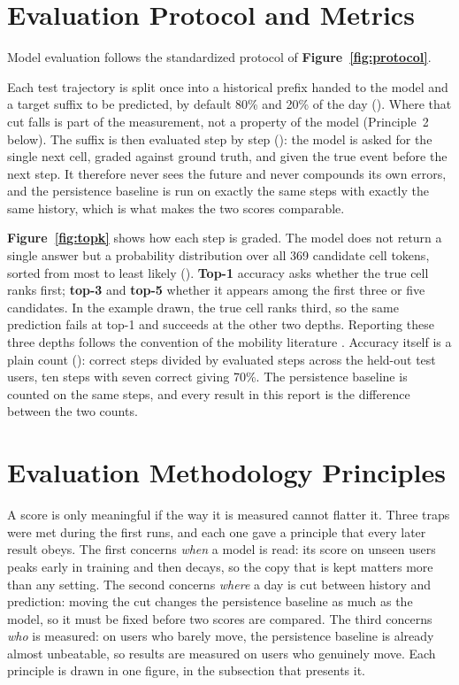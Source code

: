 \section{Evaluation Protocol and Metrics}
\label{sec:scoring}

Model evaluation follows the standardized protocol of \textbf{Figure~\ref{fig:protocol}}.



Each test trajectory is split once into a historical prefix handed to the model and a target suffix to be predicted, by default 80\% and 20\% of the day (\textbf{}). Where that cut falls is part of the measurement, not a property of the model (Principle~2 below). The suffix is then evaluated step by step (\textbf{}): the model is asked for the single next cell, graded against ground truth, and given the true event before the next step. It therefore never sees the future and never compounds its own errors, and the persistence baseline is run on exactly the same steps with exactly the same history, which is what makes the two scores comparable.

\textbf{Figure~\ref{fig:topk}} shows how each step is graded. The model does not return a single answer but a probability distribution over all 369 candidate cell tokens, sorted from most to least likely (\textbf{}). \textbf{Top-1} accuracy asks whether the true cell ranks first; \textbf{top-3} and \textbf{top-5} whether it appears among the first three or five candidates. In the example drawn, the true cell ranks third, so the same prediction fails at top-1 and succeeds at the other two depths. Reporting these three depths follows the convention of the mobility literature \textbf{\cite{luca2021survey,qin2025mobllm}}. Accuracy itself is a plain count (\textbf{}): correct steps divided by evaluated steps across the held-out test users, ten steps with seven correct giving 70\%. The persistence baseline is counted on the same steps, and every result in this report is the difference between the two counts.



\section{Evaluation Methodology Principles}

A score is only meaningful if the way it is measured cannot flatter it. Three traps were met during the first runs, and each one gave a principle that every later result obeys. The first concerns \emph{when} a model is read: its score on unseen users peaks early in training and then decays, so the copy that is kept matters more than any setting. The second concerns \emph{where} a day is cut between history and prediction: moving the cut changes the persistence baseline as much as the model, so it must be fixed before two scores are compared. The third concerns \emph{who} is measured: on users who barely move, the persistence baseline is already almost unbeatable, so results are measured on users who genuinely move. Each principle is drawn in one figure, in the subsection that presents it.

